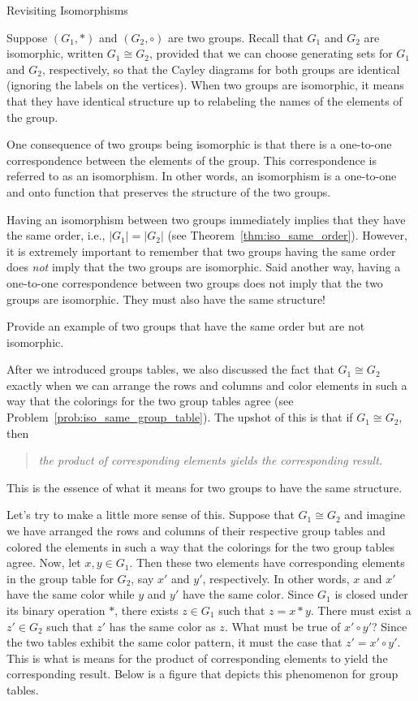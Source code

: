 \begin{section}{Revisiting Isomorphisms}

Suppose \((G_1,*)\) and \((G_2,\circ)\) are two groups.  Recall that \(G_1\) and \(G_2\) are isomorphic, written \(G_1\cong G_2\), provided that we can choose generating sets for \(G_1\) and \(G_2\), respectively, so that the Cayley diagrams for both groups are identical (ignoring the labels on the vertices).  When two groups are isomorphic, it means that they have identical structure up to relabeling the names of the elements of the group.

One consequence of two groups being isomorphic is that there is a one-to-one correspondence between the elements of the group.  This correspondence is referred to as an isomorphism.  In other words, an isomorphism is a one-to-one and onto function that preserves the structure of the two groups.  

Having an isomorphism between two groups immediately implies that they have the same order, i.e., \(|G_1|=|G_2|\) (see Theorem~\ref{thm:iso_same_order}).  However, it is extremely important to remember that two groups having the same order does \emph{not} imply that the two groups are isomorphic.  Said another way, having a one-to-one correspondence between two groups does not imply that the two groups are isomorphic.  They must also have the same structure!

\begin{exercise}
Provide an example of two groups that have the same order but are not isomorphic.
\end{exercise}

After we introduced groups tables, we also discussed the fact that \(G_1\cong G_2\) exactly when we can arrange the rows and columns and color elements in such a way that the colorings for the two group tables agree (see Problem~\ref{prob:iso_same_group_table}).  The upshot of this is that if \(G_1\cong G_2\), then
\begin{quotation}
\emph{the product of corresponding elements yields the corresponding result.}
\end{quotation}
This is the essence of what it means for two groups to have the same structure.  

Let's try to make a little more sense of this.  Suppose that \(G_1\cong G_2\) and imagine we have arranged the rows and columns of their respective group tables and colored the elements in such a way that the colorings for the two group tables agree.  Now, let \(x,y\in G_1\).  Then these two elements have corresponding elements in the group table for \(G_2\), say \(x'\) and \(y'\), respectively.  In other words, \(x\) and \(x'\) have the same color while \(y\) and \(y'\) have the same color.  Since \(G_1\) is closed under its binary operation \(*\), there exists \(z\in G_1\) such that \(z=x*y\).  There must exist a \(z'\in G_2\) such that \(z'\) has the same color as \(z\).  What must be true of \(x'\circ y'\)?  Since the two tables exhibit the same color pattern, it must the case that \(z'=x'\circ y'\).  This is what is means for the product of corresponding elements to yield the corresponding result.  Below is a figure that depicts this phenomenon for group tables.


\end{section}
